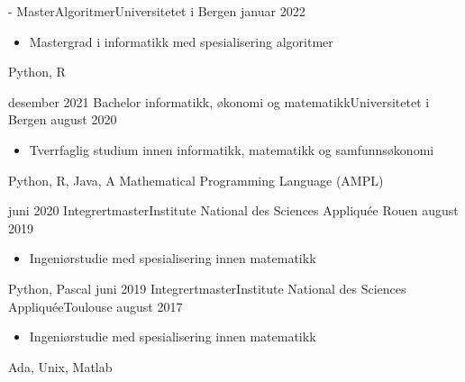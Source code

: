 %
%
%


\begin{experiences}
\experience
    {-}   {Master}{Algoritmer}{Universitetet i Bergen }
    {januar 2022}{
                    \begin{itemize}
                        \item Mastergrad i informatikk med spesialisering algoritmer
                    \end{itemize}
            }
    {Python, R}
  \emptySeparator
  
  \experience
    {desember 2021}   {Bachelor}{ informatikk, økonomi og matematikk}{Universitetet i Bergen }
    {august 2020}{
                    \begin{itemize}
                        \item Tverrfaglig studium innen informatikk, matematikk og samfunnsøkonomi 
                    \end{itemize}
    
            }
    {Python, R, Java, A Mathematical Programming Language (AMPL)}
  \emptySeparator
  
  \experience
    {juni 2020}   {Integrertmaster}{Institute National des Sciences Appliquée }{Rouen}
    {august 2019} {
                      \begin{itemize}
                        \item Ingeniørstudie med spesialisering innen matematikk 
                      \end{itemize}
                    }
                    {Python, Pascal}
  \emptySeparator
  \experience
    {juni 2019}   {Integrertmaster}{Institute National des Sciences Appliquée}{Toulouse}
    {august 2017} {
                      \begin{itemize}
                        \item Ingeniørstudie med spesialisering innen matematikk 
                      \end{itemize}
                    }
                    { Ada, Unix, Matlab}
  \emptySeparator
  
\end{experiences}